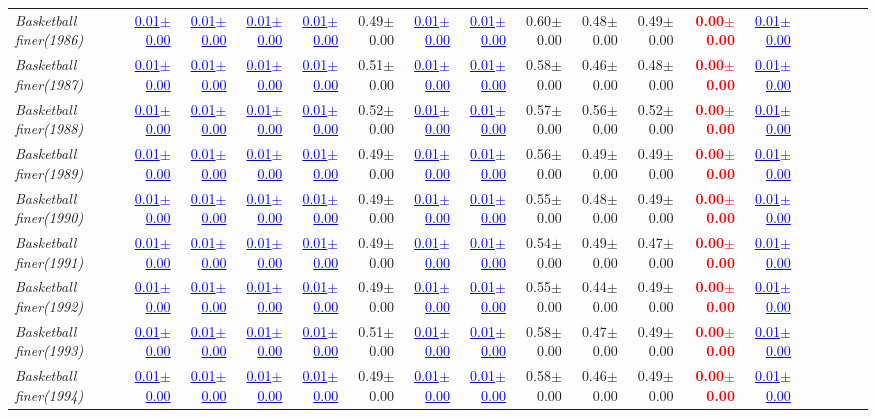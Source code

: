 \documentclass[nohyperref]{article}
\theoremstyle{plain}
\theoremstyle{definition}
\theoremstyle{remark}
\newcommand{\red}[1]{\textcolor{red}{\textbf{#1}}}
\newcommand{\blue}[1]{\textcolor{blue}{\underline{#1}}}
\begin{document}
\begin{table*}[!ht]
{\begin{tabular}{lrrrrrrrrrrrrrrrrr}
			{\it Basketball finer(1986)} & \blue{0.01$\pm$0.00} & \blue{0.01$\pm$0.00} & \blue{0.01$\pm$0.00} & \blue{0.01$\pm$0.00} & 0.49$\pm$0.00 & \blue{0.01$\pm$0.00} & \blue{0.01$\pm$0.00} & 0.60$\pm$0.00 & 0.48$\pm$0.00 & 0.49$\pm$0.00 & \red{0.00$\pm$0.00} & \blue{0.01$\pm$0.00} \\
			{\it Basketball finer(1987)} & \blue{0.01$\pm$0.00} & \blue{0.01$\pm$0.00} & \blue{0.01$\pm$0.00} & \blue{0.01$\pm$0.00} & 0.51$\pm$0.00 & \blue{0.01$\pm$0.00} & \blue{0.01$\pm$0.00} & 0.58$\pm$0.00 & 0.46$\pm$0.00 & 0.48$\pm$0.00 & \red{0.00$\pm$0.00} & \blue{0.01$\pm$0.00} \\
			{\it Basketball finer(1988)} & \blue{0.01$\pm$0.00} & \blue{0.01$\pm$0.00} & \blue{0.01$\pm$0.00} & \blue{0.01$\pm$0.00} & 0.52$\pm$0.00 & \blue{0.01$\pm$0.00} & \blue{0.01$\pm$0.00} & 0.57$\pm$0.00 & 0.56$\pm$0.00 & 0.52$\pm$0.00 & \red{0.00$\pm$0.00} & \blue{0.01$\pm$0.00} \\
			{\it Basketball finer(1989)} & \blue{0.01$\pm$0.00} & \blue{0.01$\pm$0.00} & \blue{0.01$\pm$0.00} & \blue{0.01$\pm$0.00} & 0.49$\pm$0.00 & \blue{0.01$\pm$0.00} & \blue{0.01$\pm$0.00} & 0.56$\pm$0.00 & 0.49$\pm$0.00 & 0.49$\pm$0.00 & \red{0.00$\pm$0.00} & \blue{0.01$\pm$0.00} \\
			{\it Basketball finer(1990)} & \blue{0.01$\pm$0.00} & \blue{0.01$\pm$0.00} & \blue{0.01$\pm$0.00} & \blue{0.01$\pm$0.00} & 0.49$\pm$0.00 & \blue{0.01$\pm$0.00} & \blue{0.01$\pm$0.00} & 0.55$\pm$0.00 & 0.48$\pm$0.00 & 0.49$\pm$0.00 & \red{0.00$\pm$0.00} & \blue{0.01$\pm$0.00} \\
			{\it Basketball finer(1991)} & \blue{0.01$\pm$0.00} & \blue{0.01$\pm$0.00} & \blue{0.01$\pm$0.00} & \blue{0.01$\pm$0.00} & 0.49$\pm$0.00 & \blue{0.01$\pm$0.00} & \blue{0.01$\pm$0.00} & 0.54$\pm$0.00 & 0.49$\pm$0.00 & 0.47$\pm$0.00 & \red{0.00$\pm$0.00} & \blue{0.01$\pm$0.00} \\
			{\it Basketball finer(1992)} & \blue{0.01$\pm$0.00} & \blue{0.01$\pm$0.00} & \blue{0.01$\pm$0.00} & \blue{0.01$\pm$0.00} & 0.49$\pm$0.00 & \blue{0.01$\pm$0.00} & \blue{0.01$\pm$0.00} & 0.55$\pm$0.00 & 0.44$\pm$0.00 & 0.49$\pm$0.00 & \red{0.00$\pm$0.00} & \blue{0.01$\pm$0.00} \\
			{\it Basketball finer(1993)} & \blue{0.01$\pm$0.00} & \blue{0.01$\pm$0.00} & \blue{0.01$\pm$0.00} & \blue{0.01$\pm$0.00} & 0.51$\pm$0.00 & \blue{0.01$\pm$0.00} & \blue{0.01$\pm$0.00} & 0.58$\pm$0.00 & 0.47$\pm$0.00 & 0.49$\pm$0.00 & \red{0.00$\pm$0.00} & \blue{0.01$\pm$0.00} \\
			{\it Basketball finer(1994)} & \blue{0.01$\pm$0.00} & \blue{0.01$\pm$0.00} & \blue{0.01$\pm$0.00} & \blue{0.01$\pm$0.00} & 0.49$\pm$0.00 & \blue{0.01$\pm$0.00} & \blue{0.01$\pm$0.00} & 0.58$\pm$0.00 & 0.46$\pm$0.00 & 0.49$\pm$0.00 & \red{0.00$\pm$0.00} & \blue{0.01$\pm$0.00} \\

\end{tabular}}
\end{table*}
\end{document}
